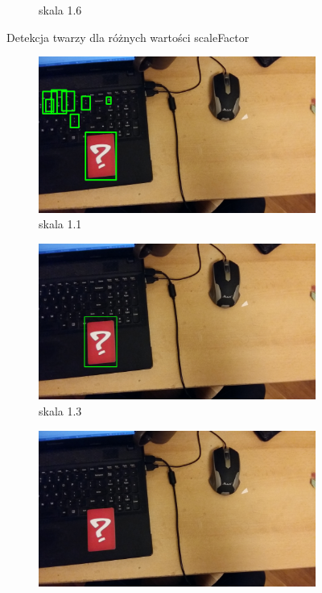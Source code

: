 \documentclass{article}
\numberwithin{equation}{section}
\begin{document}
\begin{figure}[H]
\begin{subfigure}{0.32\textwidth}
        \caption{skala 1.6}
        \label{fig:twarzSkala16}
    \end{subfigure}
    \caption{Detekcja twarzy dla różnych wartości scaleFactor}
    \label{twarzee}
\end{figure}

\begin{figure}[H]
    \centering
        \begin{subfigure}{0.32\textwidth}
        \centering
        \includegraphics[width=\linewidth]{karty11.jpg}
        \caption{skala 1.1}
        \label{fig:skalaKarta11}
    \end{subfigure}\hfill
    \begin{subfigure}{0.32\textwidth}
        \centering
        \includegraphics[width=\linewidth]{karta13.jpg}
        \caption{skala 1.3}
        \label{fig:skalaKarta13}
    \end{subfigure}\hfill
    \begin{subfigure}{0.32\textwidth}
        \centering
        \includegraphics[width=\linewidth]{kartaaskala20.jpg}

\end{subfigure}
\end{figure}
\end{document}
